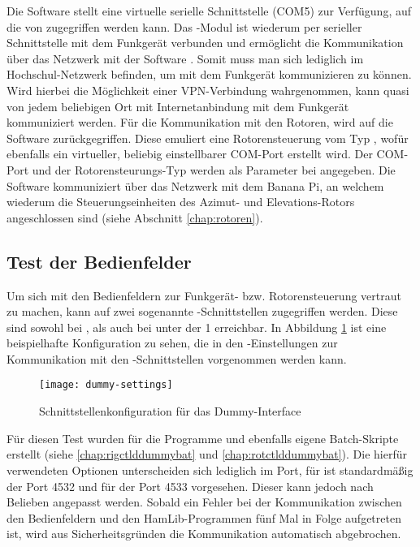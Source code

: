 Die Software  stellt eine virtuelle serielle Schnittstelle (COM5) zur Verfügung, auf die von  zugegriffen werden kann. Das -Modul ist wiederum per serieller Schnittstelle mit dem Funkgerät verbunden und ermöglicht die Kommunikation über das Netzwerk mit der Software . Somit muss man sich lediglich im Hochschul-Netzwerk befinden, um mit dem Funkgerät kommunizieren zu können. Wird hierbei die Möglichkeit einer VPN-Verbindung wahrgenommen, kann quasi von jedem beliebigen Ort mit Internetanbindung mit dem Funkgerät kommuniziert werden.\newpar
Für die Kommunikation mit den Rotoren, wird auf die Software  zurückgegriffen. Diese emuliert eine Rotorensteuerung vom Typ , wofür ebenfalls ein virtueller, beliebig einstellbarer COM-Port erstellt wird. Der COM-Port und der Rotorensteurungs-Typ werden als Parameter bei  angegeben. Die Software  kommuniziert über das Netzwerk mit dem Banana Pi, an welchem wiederum die Steuerungseinheiten des Azimut- und Elevations-Rotors angeschlossen sind (siehe Abschnitt \ref{chap:rotoren}).

\newpage

\subsection{Test der Bedienfelder}

Um sich mit den Bedienfeldern zur Funkgerät- bzw. Rotorensteuerung vertraut zu machen, kann auf zwei sogenannte -Schnittstellen zugegriffen werden. Diese sind sowohl bei , als auch bei  unter der  1 erreichbar. In Abbildung \ref{fig:dummysettings} ist eine beispielhafte Konfiguration zu sehen, die in den -Einstellungen zur Kommunikation mit den -Schnittstellen vorgenommen werden kann.

\begin{figure}[h]
	\centering
	\texttt{[image: dummy-settings]}
	\caption{Schnittstellenkonfiguration für das Dummy-Interface}
	\label{fig:dummysettings} 
\end{figure}

Für diesen Test wurden für die Programme  und  ebenfalls eigene Batch-Skripte erstellt (siehe \ref{chap:rigctlddummybat} und \ref{chap:rotctlddummybat}). Die hierfür verwendeten Optionen unterscheiden sich lediglich im Port, für  ist standardmäßig der Port 4532 und für  der Port 4533 vorgesehen. Dieser kann jedoch nach Belieben angepasst werden.\newpar
Sobald ein Fehler bei der Kommunikation zwischen den Bedienfeldern und den HamLib-Programmen fünf Mal in Folge aufgetreten ist, wird aus Sicherheitsgründen die Kommunikation automatisch abgebrochen.

